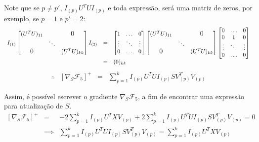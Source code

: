 \documentclass[
    12pt,                %
    oneside,            %
    a4paper,            %
    english,            %
    brazil                %
    ]{abntex2ppgsi}
\begin{document}
Note que se $p \neq p'$, $I_{(p)} U^T U I_{(p)}$ e toda expressão, será uma matriz de zeros, por exemplo, se $p=1$ e $p'=2$:
\[
\begin{array}{lcl}
    I_{(1)}
    \begin{bmatrix}
        (U^T U)_{11}            &        & \smash{\text{\large 0}} \\
                                & \ddots &                         \\
        \smash{\text{\large 0}} &        & (U^T U)_{kk}
    \end{bmatrix}
    I_{(2)}
    & = & \begin{bmatrix}
          1      & \hdots & 0      \\
          \vdots & \ddots & \vdots \\
          0      & \hdots & 0
      \end{bmatrix}
      \begin{bmatrix}
          (U^T U)_{11}            &        & \smash{\text{\large 0}} \\
                                  & \ddots &                         \\
          \smash{\text{\large 0}} &        & (U^T U)_{kk}
      \end{bmatrix}
      \begin{bmatrix}
          0      & \hdots & 0      \\
          0      &    1   & 0      \\
          \vdots & \ddots & \vdots \\
          0      & \hdots & 0
      \end{bmatrix} \\
      & = & (0)_{kk}
\end{array}
\]
\[
    \begin{array}{lclcl}
        \therefore & [\nabla_S \mathcal{F}_5]^+ & = & \sum_{p=1}^{k} I_{(p)} U^T U I_{(p)} S V_{(p)}^T V_{(p)}
    \end{array}
\]

Assim, é possível escrever o gradiente $\nabla_S \mathcal{F}_5$, a fim de encontrar uma expressão para atualização de $S$.
\[
    \begin{array}{lcl}
        [\nabla_S \mathcal{F}_5]^+ &     =    & - 2 \sum_{p=1}^{k} I_{(p)} U^T X V_{(p)} + 2 \sum_{p=1}^{k} I_{(p)} U^T U I_{(p)} S V_{(p)}^T V_{(p)} = 0 \\
                                   & \implies & \sum_{p=1}^{k} I_{(p)} U^T U I_{(p)} S V_{(p)}^T V_{(p)} = \sum_{p=1}^{k} I_{(p)} U^T X V_{(p)}
    \end{array}   \nonumber
\]
\end{document}
